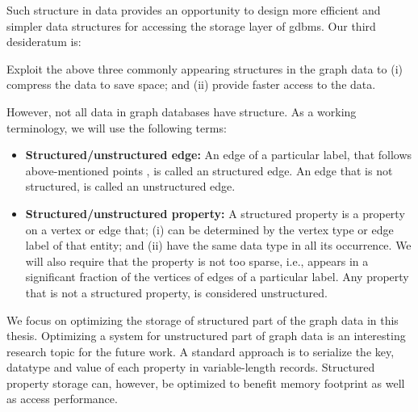 \begin{guideline}
\begin{enumerate}
	\end{enumerate}
	
	Such structure in data provides an opportunity to design more efficient and simpler data structures for accessing the storage layer of \gls{gdbms}. Our third desideratum is:
	
	\begin{desideratum}
		Exploit the above three commonly appearing structures in the graph data to (i) compress the data to save space; and (ii) provide faster access to the data.
	\end{desideratum}
	
	\vspace{-10pt}
	However, not all data in graph databases have structure. As a working terminology, we will use the following terms:
	
	\begin{itemize}
		\item \textbf{Structured/unstructured edge:} An edge of a particular label, that follows above-mentioned points , is called an structured edge. An edge that is not structured, is called an unstructured edge.
		
		\item \textbf{Structured/unstructured property:} A structured property is a property on a vertex or edge that; (i) can be determined by the vertex type or edge label of that entity; and (ii) have the same data type in all its occurrence. We will also require that the property is not too sparse, i.e., appears in a significant fraction of the vertices of edges of a particular label. Any property that is not a structured property, is considered unstructured.
		
	\end{itemize}
	
	We focus on optimizing the storage of structured part of the graph data in this thesis. Optimizing a system for unstructured part of graph data is an interesting research topic for the future work. A standard approach is to serialize the key, datatype and value of each property in variable-length records. Structured property storage can, however, be optimized to benefit memory footprint as well as access performance.
	
\end{guideline}

